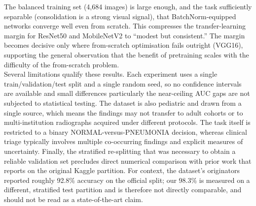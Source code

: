 \documentclass[11pt,a4paper]{article}
\numberwithin{figure}{section}
\numberwithin{table}{section}
\begin{document}
The balanced training set (4{,}684 images) is large enough, and the task sufficiently separable
(consolidation is a strong visual signal), that BatchNorm-equipped networks converge well even from
scratch. This compresses the transfer-learning margin for ResNet50 and MobileNetV2 to ``modest but
consistent.'' The margin becomes decisive only where from-scratch optimisation fails outright (VGG16),
supporting the general observation that the benefit of pretraining scales with the difficulty of the
from-scratch problem.\\

\label{sec:limits}
Several limitations qualify these results. Each experiment uses a single train/validation/test split and
a single random seed, so no confidence intervals are available and small differences particularly the
near-ceiling AUC gaps are not subjected to statistical testing. The dataset is also pediatric and drawn
from a single source, which means the findings may not transfer to adult cohorts or to multi-institution
radiographs acquired under different protocols. The task itself is restricted to a binary
NORMAL-versus-PNEUMONIA decision, whereas clinical triage typically involves multiple co-occurring
findings and explicit measures of uncertainty. Finally, the stratified re-splitting that was necessary to
obtain a reliable validation set precludes direct numerical comparison with prior work that reports on
the original Kaggle partition. For context, the dataset's originators \cite{kermany} reported roughly
92.8\% accuracy on the official split; our 98.3\% is measured on a different, stratified test partition
and is therefore not directly comparable, and should not be read as a state-of-the-art claim.\\
\end{document}

